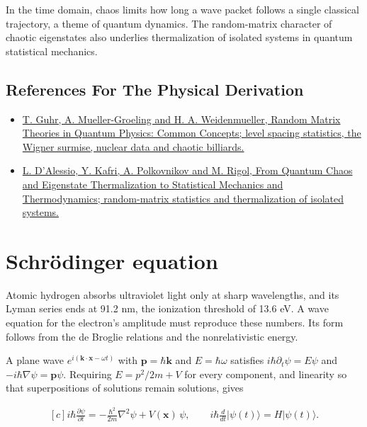 \documentclass[11pt,oneside]{book}
\newenvironment{centeredalign}{\[\begin{gathered}[c]}{\end{gathered}\]}
\begin{document}
In the time domain, chaos limits how long a wave packet follows a single classical trajectory, a theme of quantum dynamics. The random-matrix character of chaotic eigenstates also underlies thermalization of isolated systems in quantum statistical mechanics.

\subsection*{References For The Physical Derivation}
\begin{itemize}
\item \href{https://arxiv.org/abs/cond-mat/9707301}{T. Guhr, A. Mueller-Groeling and H. A. Weidenmueller, Random Matrix Theories in Quantum Physics: Common Concepts; level spacing statistics, the Wigner surmise, nuclear data and chaotic billiards.}
\item \href{https://arxiv.org/abs/1509.06411}{L. D'Alessio, Y. Kafri, A. Polkovnikov and M. Rigol, From Quantum Chaos and Eigenstate Thermalization to Statistical Mechanics and Thermodynamics; random-matrix statistics and thermalization of isolated systems.}
\end{itemize}





\clearpage

\section{Schrödinger equation}

\label{topic:schr-dinger-equation}

Atomic hydrogen absorbs ultraviolet light only at sharp wavelengths, and its Lyman series ends at 91.2 nm, the ionization threshold of 13.6 eV. A wave equation for the electron's amplitude must reproduce these numbers. Its form follows from the de Broglie relations and the nonrelativistic energy.

A plane wave \(e^{i(\mathbf k\cdot\mathbf x-\omega t)}\) with \(\mathbf p=\hbar\mathbf k\) and \(E=\hbar\omega\) satisfies \(i\hbar\partial_t\psi=E\psi\) and \(-i\hbar\nabla\psi=\mathbf p\psi\). Requiring \(E=p^2/2m+V\) for every component, and linearity so that superpositions of solutions remain solutions, gives

\begin{centeredalign}
i\hbar\frac{\partial\psi}{\partial t}=-\frac{\hbar^2}{2m}\nabla^2\psi+V(\mathbf x)\,\psi,
\qquad i\hbar\frac{d}{dt}|\psi(t)\rangle=H|\psi(t)\rangle.
\end{centeredalign}
\end{document}

